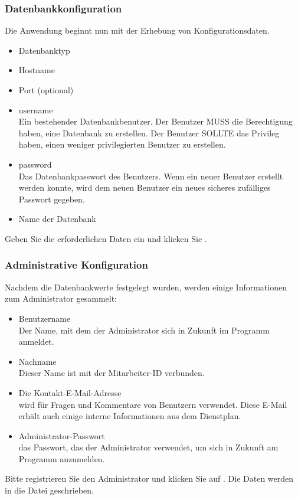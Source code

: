 \subsubsection{Datenbankkonfiguration}
Die Anwendung beginnt nun mit der Erhebung von Konfigurationsdaten.
\begin{itemize}
\item Datenbanktyp
\item Hostname
\item Port (optional)
\item username \\Ein bestehender Datenbankbenutzer. Der Benutzer MUSS die
Berechtigung haben, eine Datenbank zu erstellen. Der Benutzer SOLLTE das
Privileg haben, einen weniger privilegierten Benutzer zu erstellen.
\item password \\Das Datenbankpasswort des Benutzers. Wenn ein neuer Benutzer
erstellt werden konnte, wird dem neuen Benutzer ein neues sicheres
zufälliges Passwort gegeben.
\item Name der Datenbank
\end{itemize}
Geben Sie die erforderlichen Daten ein und klicken Sie .

\subsubsection{Administrative Konfiguration}
Nachdem die Datenbankwerte festgelegt wurden, werden einige Informationen
zum Administrator gesammelt:
\begin{itemize}
    \item Benutzername \\ Der Name, mit dem der Administrator sich in Zukunft im
Programm anmeldet. 
    \item Nachname \\ Dieser Name ist mit der Mitarbeiter-ID verbunden.
    \item Die Kontakt-E-Mail-Adresse \\ wird für Fragen und Kommentare von Benutzern
verwendet. Diese E-Mail erhält auch einige interne Informationen aus dem
Dienstplan.
    \item Administrator-Passwort \\ das Passwort, das der Administrator verwendet, um
sich in Zukunft am Programm anzumelden. 
\end{itemize}
Bitte registrieren Sie den Administrator und klicken Sie auf
. Die Daten werden in die Datei 
geschrieben.

